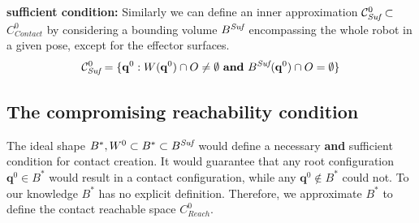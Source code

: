 \documentclass[journal]{IEEEtran}
\begin{document}

\textbf{sufficient condition:}
Similarly we can define an inner approximation \mbox{$\mathcal{C}^0_{\textrm{\it Suf}} \subset $ $C_{Contact}^0$} by considering a bounding volume $B^{\textrm{\it Suf}}$ encompassing the whole robot in a given pose, except for the effector surfaces. 
\begin{equation}
\mathcal{C}^0_{\textrm{\it Suf}} = \{ \mathbf{q}^0 : W(\mathbf{q}^{0}) \cap O \neq \emptyset \textrm{ \textbf{and}}\ B^{\textrm{\it Suf}}(\mathbf{q}^{0}) \cap O = \emptyset \} %
\end{equation}


\subsection{The compromising reachability condition}
\label{sec:scaling}
The ideal shape $B^*, W^0 \subset B^* \subset B^{\textrm{\it Suf}}$ would define a necessary \textbf{and} sufficient condition for contact creation. 
It would guarantee that any root configuration $\mathbf{q}^{0} \in B^*$ would result in a contact configuration, while any $\mathbf{q}^{0} \notin B^*$ could not.
To our knowledge  $B^*$ has no explicit definition.
Therefore, we approximate $B^*$ to define the contact reachable space $C_{Reach}^0$.
\end{document}
